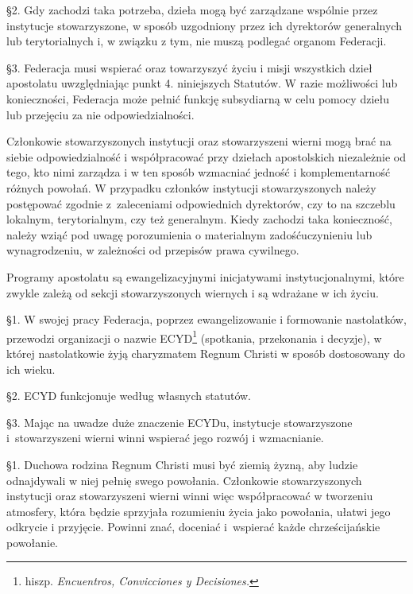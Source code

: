 \S{}2.  Gdy zachodzi taka potrzeba, dzieła mogą być zarządzane wspólnie przez instytucje stowarzyszone, w sposób uzgodniony przez ich dyrektorów generalnych lub terytorialnych i, w związku z tym, nie muszą podlegać organom Federacji.


\S{}3. Federacja musi wspierać oraz towarzyszyć życiu i misji wszystkich dzieł apostolatu uwzględniając punkt 4. niniejszych Statutów. W razie możliwości lub konieczności, Federacja może pełnić funkcję subsydiarną w celu pomocy dziełu lub przejęciu za nie odpowiedzialności.
 
 
 Członkowie stowarzyszonych instytucji oraz stowarzyszeni wierni mogą brać na siebie odpowiedzialność i współpracować przy dziełach apostolskich niezależnie od tego, kto nimi zarządza i w ten sposób wzmacniać jedność i komplementarność różnych powołań. W przypadku członków instytucji stowarzyszonych należy postępować zgodnie \mbox{z zaleceniami} odpowiednich dyrektorów, czy to na szczeblu lokalnym, terytorialnym, czy też generalnym. Kiedy zachodzi taka konieczność, należy wziąć pod uwagę porozumienia o materialnym zadośćuczynieniu lub wynagrodzeniu, w zależności od przepisów prawa cywilnego.
 
 
 Programy apostolatu są ewangelizacyjnymi inicjatywami instytucjonalnymi, które zwykle zależą od sekcji stowarzyszonych wiernych i są wdrażane w ich życiu.
 
 
 \S{}1. W swojej pracy Federacja, poprzez ewangelizowanie i formowanie nastolatków, przewodzi organizacji o nazwie ECYD\footnote{hiszp. {\em Encuentros, Convicciones y Decisiones.}} (spotkania, przekonania i decyzje), w której nastolatkowie żyją charyzmatem Regnum Christi w sposób dostosowany do ich wieku.


\S{}2. ECYD funkcjonuje według własnych statutów.


\S{}3. Mając na uwadze duże znaczenie ECYDu, instytucje stowarzyszone \mbox{i stowarzyszeni} wierni winni wspierać jego rozwój i wzmacnianie.
 
 
 \S{}1. Duchowa rodzina Regnum Christi musi być ziemią żyzną, aby ludzie odnajdywali w niej pełnię swego powołania. Członkowie stowarzyszonych instytucji oraz stowarzyszeni wierni winni więc współpracować w tworzeniu atmosfery, która będzie sprzyjała rozumieniu życia jako powołania, ułatwi jego odkrycie i przyjęcie. Powinni znać, doceniać \mbox{i wspierać} każde chrześcijańskie powołanie.


